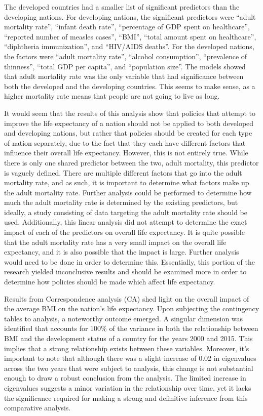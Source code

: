 \documentclass[12pt]{article}
\begin{document}
\begin{multicols}{2}
The developed countries had a smaller list of significant predictors than the developing nations. For developing nations, the significant predictors were “adult mortality rate”, “infant death rate”, “percentage of GDP spent on healthcare”, “reported number of measles cases”, “BMI”, “total amount spent on healthcare”, “diphtheria immunization”, and “HIV/AIDS deaths”. For the developed nations, the factors were “adult mortality rate”, “alcohol consumption”, “prevalence of thinness”, “total GDP per capita”, and “population size”. The models showed that adult mortality rate was the only variable that had significance between both the developed and the developing countries. This seems to make sense, as a higher mortality rate means that people are not going to live as long. 

It would seem that the results of this analysis show that policies that attempt to improve the life expectancy of a nation should not be applied to both developed and developing nations, but rather that policies should be created for each type of nation separately, due to the fact that they each have different factors that influence their overall life expectancy. However, this is not entirely true. While there is only one shared predictor between the two, adult mortality, this predictor is vaguely defined. There are multiple different factors that go into the adult mortality rate, and as such, it is important to determine what factors make up the adult mortality rate. Further analysis could be performed to determine how much the adult mortality rate is determined by the existing predictors, but ideally, a study consisting of data targeting the adult mortality rate should be used. Additionally, this linear analysis did not attempt to determine the exact impact of each of the predictors on overall life expectancy. It is quite possible that the adult mortality rate has a very small impact on the overall life expectancy, and it is also possible that the impact is large. Further analysis would need to be done in order to determine this. Essentially, this portion of the research yielded inconclusive results and should be examined more in order to determine how policies should be made which affect life expectancy. 

Results from Correspondence analysis (CA) shed light on the overall impact of the average BMI on the nation’s life expectancy. Upon subjecting the contingency tables to analysis, a noteworthy outcome emerged. A singular dimension was identified that accounts for 100\% of the variance in both the relationship between BMI and the development status of a country for the years 2000 and 2015. This implies that a strong relationship exists between these variables. Moreover, it's important to note that although there was a slight increase of 0.02 in eigenvalues across the two years that were subject to analysis, this change is not substantial enough to draw a robust conclusion from the analysis. The limited increase in eigenvalues suggests a minor variation in the relationship over time, yet it lacks the significance required for making a strong and definitive inference from this comparative analysis.


\end{multicols}
\end{document}
